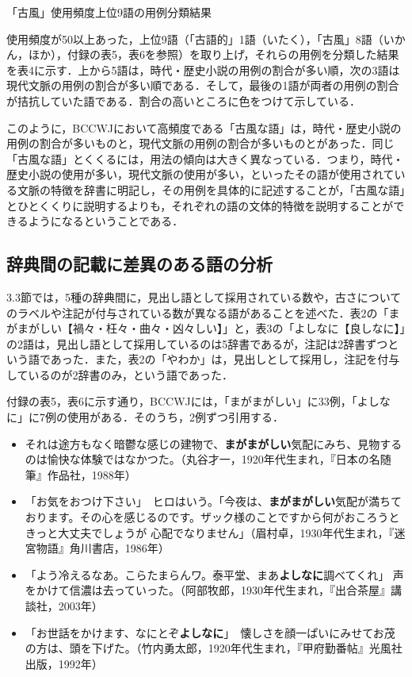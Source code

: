 \documentclass[japanese]{jnlp_1.4}
\begin{document}
\begin{table}[b]
\caption{「古風」使用頻度上位9語の用例分類結果}

\end{table}

使用頻度が50以上あった，上位9語（「古語的」1語（いたく），「古風」8語（いかん，ほか），付録の表5，表6を参照）を取り上げ，それらの用例を分類した結果を表4に示す．上から5語は，時代・歴史小説の用例の割合が多い順，次の3語は現代文脈の用例の割合が多い順である．そして，最後の1語が両者の用例の割合が拮抗していた語である．割合の高いところに色をつけて示している．

このように，BCCWJにおいて高頻度である「古風な語」は，時代・歴史小説の用例の割合が多いものと，現代文脈の用例の割合が多いものとがあった．同じ「古風な語」とくくるには，用法の傾向は大きく異なっている．つまり，時代・歴史小説の使用が多い，現代文脈の使用が多い，といったその語が使用されている文脈の特徴を辞書に明記し，その用例を具体的に記述することが，「古風な語」とひとくくりに説明するよりも，それぞれの語の文体的特徴を説明することができるようになるということである．


\subsection{辞典間の記載に差異のある語の分析}

3.3節では，5種の辞典間に，見出し語として採用されている数や，古さについてのラベルや注記が付与されている数が異なる語があることを述べた．表2の「まがまがしい【禍々・枉々・曲々・凶々しい】」と，表3の「よしなに【良しなに】」の2語は，見出し語として採用しているのは5辞書であるが，注記は2辞書ずつという語であった．また，表2の「やわか」は，見出しとして採用し，注記を付与しているのが2辞書のみ，という語であった．

付録の表5，表6に示す通り，BCCWJには，「まがまがしい」に33例，「よしなに」に7例の使用がある．そのうち，2例ずつ引用する．

\begin{itemize}
\item
それは途方もなく暗鬱な感じの建物で、\textbf{まがまがしい}気配にみち、見物するのは愉快な体験ではなかつた。（丸谷才一，1920年代生まれ，『日本の名随筆』作品社，1988年）

\item
「お気をおつけ下さい」　ヒロはいう。「今夜は、\textbf{まがまがしい}気配が満ちております。その心を感じるのです。ザック様のことですから何がおころうときっと大丈夫でしょうが\textellipsis 
心配でなりません」（眉村卓，1930年代生まれ，『迷宮物語』角川書店，1986年）

\item
「よう冷えるなあ。こらたまらんワ。泰平堂、まあ\textbf{よしなに}調べてくれ」 
声をかけて信濃は去っていった。（阿部牧郎，1930年代生まれ，『出合茶屋』講談社，2003年）

\item
「お世話をかけます、なにとぞ\textbf{よしなに}」　懐しさを顔一ぱいにみせてお茂の方は、頭を下げた。（竹内勇太郎，1920年代生まれ，『甲府勤番帖』光風社出版，1992年）
\end{itemize}
\end{document}
